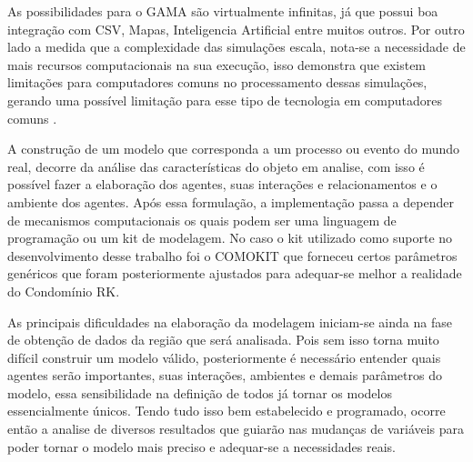 As possibilidades para o GAMA são virtualmente infinitas, já que possui boa integração com CSV, Mapas, Inteligencia Artificial entre muitos outros. Por outro lado a medida que a complexidade das simulações escala, nota-se a necessidade de mais recursos computacionais na sua execução, isso demonstra que existem limitações para computadores comuns no processamento dessas simulações, gerando uma possível limitação para esse tipo de tecnologia em computadores comuns\cite{gamaplataform} .

A construção de um modelo que corresponda a um processo ou evento do mundo real, decorre da análise das características do objeto em analise, com isso é possível fazer a elaboração dos agentes, suas interações e relacionamentos e o ambiente dos agentes. Após essa formulação, a implementação passa a depender de mecanismos computacionais os quais podem ser uma linguagem de programação ou um kit de modelagem\cite{macaltutorial:online}. No caso o kit utilizado como suporte no desenvolvimento desse trabalho foi o COMOKIT que forneceu certos parâmetros genéricos que foram posteriormente ajustados para adequar-se melhor a realidade do Condomínio RK.

As principais dificuldades na elaboração da modelagem iniciam-se ainda na fase de obtenção de dados da região que será analisada. Pois sem isso torna muito difícil construir um modelo válido, posteriormente é necessário entender quais agentes serão importantes, suas interações, ambientes e demais parâmetros do modelo, essa sensibilidade na definição de todos já tornar os modelos essencialmente únicos. Tendo tudo isso bem estabelecido e programado, ocorre então a analise de diversos resultados que guiarão nas mudanças de variáveis para poder tornar o modelo mais preciso e adequar-se a necessidades reais.



 





